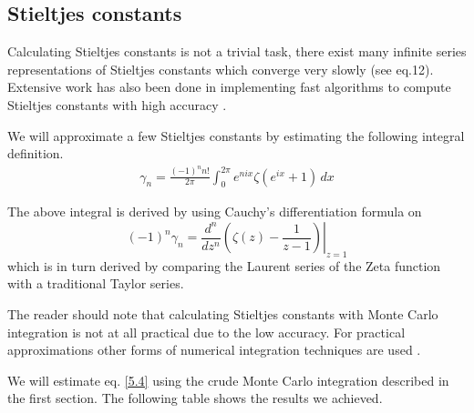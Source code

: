 \documentclass[12pt]{article}
\numberwithin{equation}{section}
\begin{document}
\subsection{Stieltjes constants}
Calculating Stieltjes constants is not a trivial task, there exist many infinite series representations of Stieltjes constants which converge very slowly \cite{stieltjeswolfram} (see eq.12). Extensive work has also been done in implementing fast algorithms to compute Stieltjes constants with high accuracy \cite{johansson2018computing}.
\par We will approximate a few Stieltjes constants by estimating the following integral definition.
\begin{align}
    \gamma_n = \frac{(-1)^n n!}{2 \pi} \int_0^{2 \pi} e^{nix} \zeta (e^{ix}+1)\, dx \label{5.4}
\end{align}
\par The above integral is derived by using Cauchy's differentiation formula on $$(-1)^n \gamma_n= \frac{d^n}{dz^n} \left. \left ( \zeta(z) - \frac{1}{z-1}\right)\right|_{z=1}$$
which is in turn derived by comparing the Laurent series of the Zeta function with a traditional Taylor series.
\par The reader should note that calculating Stieltjes constants with Monte Carlo integration is not at all practical due to the low accuracy. For practical approximations other forms of numerical integration techniques are used \cite{johansson2018computing, newtoncotes}.
\par We will estimate eq. \ref{5.4} using the crude Monte Carlo integration described in the first section. The following table shows the results we achieved.
\end{document}
